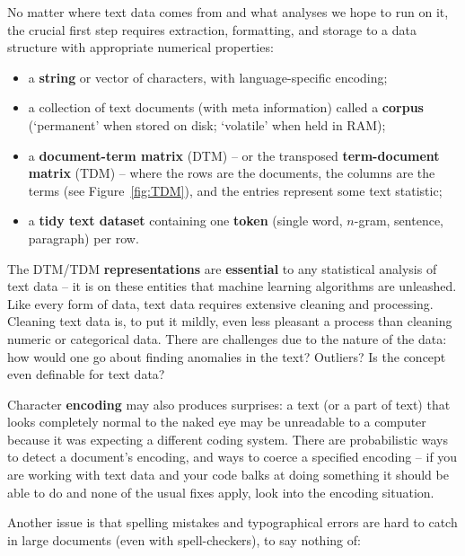 No matter where text data comes from and what analyses we hope to run on it, the crucial first step requires extraction, formatting, and storage to a data structure with appropriate numerical properties:  \begin{itemize}[noitemsep] 
\item a \textbf{string} or vector of characters, with language-specific encoding;
\item a collection of text documents (with meta information) called a \textbf{corpus} (`permanent' when stored on disk; `volatile' when held in RAM); 
\item a \textbf{document-term matrix} (DTM) -- or the transposed \textbf{term-document matrix} (TDM) -- where the rows are the documents, the columns are the terms (see Figure~\ref{fig:TDM}), and the entries represent some text statistic;
\item a \textbf{tidy text dataset} containing one \textbf{token} (single word, $n$-gram, sentence, paragraph) per row. 
\end{itemize}
The DTM/TDM \textbf{representations} are \textbf{essential} to any statistical analysis of text data  -- it is on these entities that machine learning  algorithms are unleashed. \newl 
Like every form of data, text data requires extensive cleaning and processing. Cleaning text data is, to put it mildly, even less pleasant a process than cleaning numeric or categorical data. There are  challenges due to the nature of the data: how would one go about finding anomalies in the text? Outliers? Is the concept even definable for text data? \par Character \textbf{encoding} may also produces surprises: a text (or a part of text) that looks completely normal to the naked eye may be unreadable to a computer because it was expecting a different coding system. There are probabilistic ways to detect a document's encoding, and ways to coerce a specified encoding -- if you are working with text data and your code balks at doing something it should be able to do and none of the usual fixes apply, look into the encoding situation.  
\par Another issue is that spelling mistakes and typographical errors are hard to catch in large documents (even with spell-checkers), to say nothing of:
